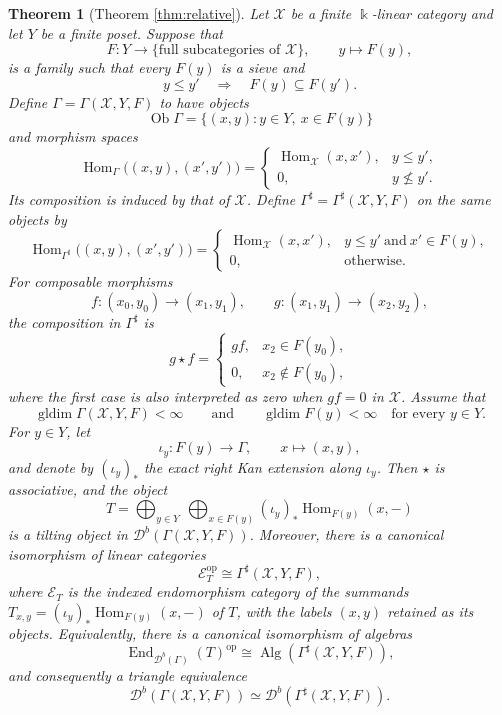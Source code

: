 \documentclass[12pt,a4paper,english,reqno]{amsart}
\theoremstyle{plain}
\newtheorem{theorem}{Theorem}[section]
\theoremstyle{definition}
\newcommand{\kk}{\Bbbk}
\newcommand{\Hom}{\operatorname{Hom}}
\newcommand{\End}{\operatorname{End}}
\newcommand{\gldim}{\operatorname{gldim}}
\newcommand{\op}{\mathrm{op}}
\newcommand{\X}{\mathcal X}
\newcommand{\G}{\Gamma}
\newcommand{\Gs}{\Gamma^{\sharp}}
\newcommand{\Db}[1]{{\mathscr D}^b(#1)}
\begin{document}
\begin{theorem}[Theorem \ref{thm:relative}]
\label{thm:intro-relative}
Let $\X$ be a finite $\kk$-linear category and let $Y$ be a finite
poset.  Suppose that
\[
 F\colon Y\longrightarrow
 \{\text{full subcategories of }\X\},\qquad
 y\longmapsto F(y),
\]
is a family such that every $F(y)$ is a sieve and
\[
 y\leq y'\quad\Longrightarrow\quad
 F(y)\subseteq F(y').
\]
Define $\G=\G(\X,Y,F)$ to have objects
\[
 \operatorname{Ob}\G
 =\{(x,y):y\in Y,\ x\in F(y)\}
\]
and morphism spaces
\[
 \Hom_{\G}\bigl((x,y),(x',y')\bigr)
 =
 \begin{cases}
  \Hom_{\X}(x,x'),&y\leq y',\\
  0,&y\nleq y'.
 \end{cases}
\]
Its composition is induced by that of $\X$.  Define
$\Gs=\Gs(\X,Y,F)$ on the same objects by
\[
 \Hom_{\Gs}\bigl((x,y),(x',y')\bigr)
 =
 \begin{cases}
  \Hom_{\X}(x,x'),&
  y\leq y'\ \text{and}\ x'\in F(y),\\
  0,&\text{otherwise}.
 \end{cases}
\]
For composable morphisms
\[
 f\colon(x_0,y_0)\longrightarrow(x_1,y_1),
 \qquad
 g\colon(x_1,y_1)\longrightarrow(x_2,y_2),
\]
the composition in $\Gs$ is
\[
 g\star f=
 \begin{cases}
  gf,&x_2\in F(y_0),\\
  0,&x_2\notin F(y_0),
 \end{cases}
\]
where the first case is also interpreted as zero when $gf=0$ in
$\X$.  Assume that
\[
 \gldim\G(\X,Y,F)<\infty
 \qquad\text{and}\qquad
 \gldim F(y)<\infty\quad\text{for every }y\in Y.
\]
For $y\in Y$, let
\[
 \iota_y:F(y)\longrightarrow\G,\qquad x\longmapsto(x,y),
\]
and denote by $(\iota_y)_*$ the exact right Kan extension along
$\iota_y$.  Then $\star$ is associative, and the object
\[
 T=\bigoplus_{y\in Y}\ \bigoplus_{x\in F(y)}
 (\iota_y)_*\Hom_{F(y)}(x,-)
\]
is a tilting object in $\Db{\G(\X,Y,F)}$. Moreover, there is a canonical
isomorphism of linear categories
\[
 \mathcal E_T^{\op}\cong\Gs(\X,Y,F),
\]
where $\mathcal E_T$ is the indexed endomorphism category of the summands
$T_{x,y}=(\iota_y)_*\Hom_{F(y)}(x,-)$ of $T$, with the labels $(x,y)$
retained as its objects.
Equivalently, there is a canonical isomorphism of algebras
\[
 \End_{\Db{\G}}(T)^{\op}
 \cong\operatorname{Alg}\!\left(\Gs(\X,Y,F)\right),
\]
and consequently a triangle equivalence
\[
 \Db{\G(\X,Y,F)}
 \simeq
 \Db{\Gs(\X,Y,F)}.
\]
\end{theorem}
\end{document}
